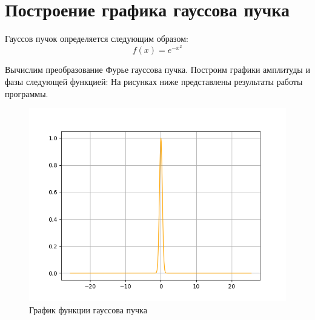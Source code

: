 \section{Построение графика гауссова пучка}
{
    Гауссов пучок определяется следующим образом:
    \begin{equation}
        f(x) = e^{-x^2}
    \end{equation}


    Вычислим преобразование Фурье гауссова пучка. Построим графики амплитуды и фазы следующей функцией:
    На рисунках ниже представлены результаты работы программы.
    	\begin{figure}[H]
       \centering
            \includegraphics[width=\textwidth,height=\textheight,keepaspectratio]{Gauss_beam_fft.png}
            \caption{График функции гауссова пучка}
            \label{gauss_beam_pic}
    \end{figure}

}
